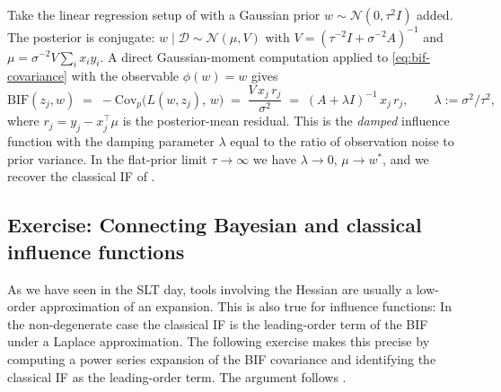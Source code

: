 \documentclass[11pt]{article}
\begin{document}
\begin{example}\label{ex:bayesian-ols}
Take the linear regression setup of  with a Gaussian prior $w\sim\mathcal{N}(0,\tau^2I)$ added. The posterior is conjugate: $w\mid\mathcal{D}\sim\mathcal{N}(\mu,V)$ with $V = (\tau^{-2}I + \sigma^{-2}A)^{-1}$ and $\mu = \sigma^{-2}V\sum_i x_i y_i$. A direct Gaussian-moment computation applied to \eqref{eq:bif-covariance} with the observable $\phi(w) = w$ gives
\[
  \mathrm{BIF}(z_j, w) \;=\; -\mathrm{Cov}_p\bigl(L(w,z_j),\,w\bigr) \;=\; \frac{V\, x_j\, r_j}{\sigma^2} \;=\; (A + \lambda I)^{-1}\,x_j\,r_j, \qquad \lambda := \sigma^2/\tau^2,
\]
where $r_j = y_j - x_j^\top\mu$ is the posterior-mean residual. This is the \emph{damped} influence function with the damping parameter $\lambda$ equal to the ratio of observation noise to prior variance. In the flat-prior limit $\tau\to\infty$ we have $\lambda\to 0$, $\mu\to w^*$, and we recover the classical IF of .
\end{example}

\subsection{Exercise: Connecting Bayesian and classical influence functions}\label{subsec:bif-if-connection}
As we have seen in the SLT day, tools involving the Hessian are usually a low-order approximation of an expansion. This is also true for influence functions: In the non-degenerate case the classical IF is the leading-order term of the BIF under a Laplace approximation. The following exercise makes this precise by computing a power series expansion of the BIF covariance and identifying the classical IF as the leading-order term. The argument follows \citet[Appendix~A]{kreer2025bif}.
\end{document}
